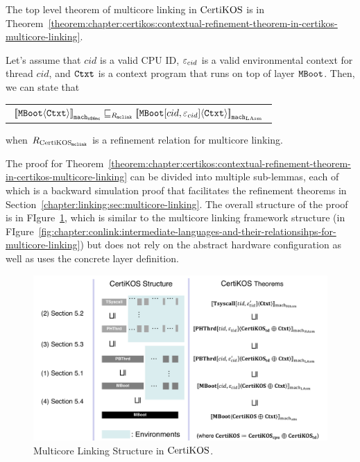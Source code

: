 The top level theorem of
multicore linking in $\mathrm{CertiKOS}$  is in Theorem~\ref{theorem:chapter:certikos:contextual-refinement-theorem-in-certikos-multicore-linking}.
\begin{theorem}
\label{theorem:chapter:certikos:contextual-refinement-theorem-in-certikos-multicore-linking}
Let's assume that $cid$ is a valid CPU ID, ${\varepsilon}_{cid}$ is a valid
environmental context for thread $cid$, and ${\mathrm{\texttt{Ctxt}}}$ is a
 context program that runs on top of layer ${\mathrm{\texttt{MBoot}}}$. 
 Then, we can state that
 \begin{center}
\begin{tabular}{c}
${[\![{{\mathrm{\texttt{MBoot}}}} \langle {{\mathrm{\texttt{Ctxt}}}} \rangle]\!]}_{{\mathrm{\texttt{mach}}}_{{\mathrm{\texttt{x86mc}}}}} \sqsubseteq_{R_{{\mathrm{\texttt{mclink}}}}} {[\![{{\mathrm{\texttt{MBoot}}}[cid, {\varepsilon}_{cid}]} \langle {{\mathrm{\texttt{Ctxt}}}} \rangle]\!]}_{{{\mathrm{\texttt{mach}}}_{\mathrm{LAsm}}}}$\\
\end{tabular}
\end{center}
when ${R_{\mathrm{CertiKOS}_{\mathrm{\texttt{mclink}}}}}$ is a refinement relation for multicore linking.
\end{theorem}


The proof for Theorem~\ref{theorem:chapter:certikos:contextual-refinement-theorem-in-certikos-multicore-linking} 
can be divided into multiple sub-lemmas, each of which is a backward simulation proof 
that facilitates the refinement theorems in Section~\ref{chapter:linking:sec:multicore-linking}. 
The overall structure of the proof is in FIgure~\ref{fig:chapter:certikos:multicore-connect-proof-overall-structure}, which is 
similar to the multicore linking framework structure (in FIgure~\ref{fig:chapter:conlink:intermediate-languages-and-their-relationsihps-for-multicore-linking}) but does not rely on
the abstract hardware configuration as well as uses the concrete layer definition. 
 
\begin{figure}
\includegraphics[width=\textwidth, page=2]{figs/certikos/concurrent_linking}
\caption{Multicore Linking Structure in $\mathrm{CertiKOS}$.}
\label{fig:chapter:certikos:multicore-connect-proof-overall-structure}
\end{figure}



